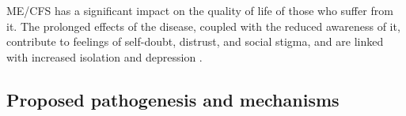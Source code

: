 ME/CFS has a significant impact on the quality of life of those who suffer from it. The prolonged effects of the disease, coupled with the reduced awareness of it, contribute to feelings of self-doubt, distrust, and social stigma, and are linked with increased isolation and depression \citep{instituteofmedicine2015MyalgicEncephalomyelitis, lacerda2019HopeDisappointment}.




\subsection{Proposed pathogenesis and mechanisms}
\label{subsec:pathogenesis}


